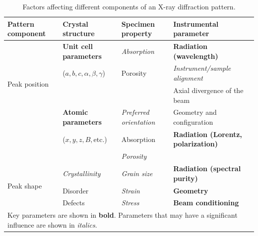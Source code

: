 \documentclass[aps,prb,twocolumn,superscriptaddress]{revtex4-2}
\begin{document}
\begin{table}[]
\caption{Factors affecting different components of an X-ray diffraction pattern.}
\label{tab:DiffractionFactors}
\centering
\begin{tabular}{llll}
\hline
Pattern component & Crystal structure & Specimen property & Instrumental parameter \\ \hline
\multirow{4}{*}{Peak position}  
  & \textbf{Unit cell parameters} & \textit{Absorption} & \textbf{Radiation (wavelength)} \\
  & ($a, b, c, \alpha, \beta, \gamma$) & Porosity & \textit{Instrument/sample alignment} \\
  & & & Axial divergence of the beam \\ \hline
\multirow{3}{*}{Peak intensity}  
  & \textbf{Atomic parameters} & \textit{Preferred orientation} & Geometry and configuration \\
  & ($x, y, z, B, \text{etc.}$) & Absorption & \textbf{Radiation (Lorentz, polarization)} \\
  & & \textit{Porosity} &  \\ \hline
\multirow{3}{*}{Peak shape}  
  & \textit{Crystallinity} & \textit{Grain size} & \textbf{Radiation (spectral purity)} \\
  & Disorder & \textit{Strain} & \textbf{Geometry} \\
  & Defects & \textit{Stress} & \textbf{Beam conditioning} \\ \hline
\multicolumn{4}{l}{Key parameters are shown in \textbf{bold}. Parameters that may have a significant influence are shown in \textit{italics}.} \\ \hline
\end{tabular}
\end{table}
\end{document}
